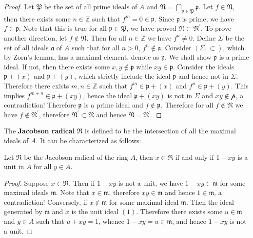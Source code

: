 \begin{proof}
Let $\mathfrak{P}$ be the set of all prime ideals of $A$ and $\mathfrak{N}=\bigcap_{\mathfrak{p}\in\mathfrak{P}}\mathfrak{p}$. Let $f\in\mathfrak{N}$, then there exists some $n\in\mathbb{Z}$ such that $f^m=0\in\mathfrak{p}$. Since $\mathfrak{p}$ is prime, we have $f\in\mathfrak{p}$. Note that this is true for all $\mathfrak{p}\in\mathfrak{P}$, we have proved $\mathfrak{N}\subset\mathfrak{N}^\prime$. To prove another direction, let $f\notin\mathfrak{N}$. Then for all $n\in\mathbb{Z}$ we have $f^n\ne 0$. Define $\Sigma$ be the set of all ideals $\mathfrak{a}$ of $A$ such that for all $n>0$, $f^n\notin\mathfrak{a}$. Consider $(\Sigma,\subset)$, which by Zorn's lemma, has a maximal element, denote as $\mathfrak{p}$. We shall show $\mathfrak{p}$ is a prime ideal. If not, then there exists some $x,y\notin\mathfrak{p}$ while $xy\in\mathfrak{p}$. Consider the ideals $\mathfrak{p}+(x)$ and $\mathfrak{p}+(y)$, which strictly include the ideal $\mathfrak{p}$ and hence not in $\Sigma$. Therefore there exists $m,n\in\mathbb{Z}$ such that $f^m\in\mathfrak{p}+(x)$ and $f^n\in\mathfrak{p}+(y)$. This implies $f^{m+n}\in\mathfrak{p}+(xy)$, hence the ideal $\mathfrak{p}+(xy)$ is not in $\Sigma$ and $xy\notin\mathcal{p}$, a contradiction! Therefore $\mathfrak{p}$ is a prime ideal and $f\notin\mathfrak{p}$. Therefore for all $f\notin\mathfrak{N}$ we have $f\notin\mathfrak{N}^\prime$, therefore $\mathfrak{N}^\prime\subset\mathfrak{N}$ and hence $\mathfrak{N}=\mathfrak{N}^\prime$.
\end{proof}
The \textbf{Jacobson radical} $\mathfrak{R}$ is defined to be the intersection of all the maximal ideals of $A$. It can be characterized as follows:
\begin{proposition}
Let $\mathfrak{R}$ be the Jacobson radical of the ring $A$, then $x\in\mathfrak{R}$ if and only if $1-xy$ is a unit in $A$ for all $y\in A$.
\end{proposition}
\begin{proof}
Suppose $x\in\mathfrak{R}$. Then if $1-xy$ is not a unit, we have $1-xy\in\mathfrak{m}$ for some maximal ideals $\mathfrak{m}$. Note that $x\in\mathfrak{m}$, therefore $xy\in\mathfrak{m}$ and hence $1\in\mathfrak{m}$, a contradiction! Conversely, if $x\notin\mathfrak{m}$ for some maximal ideal $\mathfrak{m}$. Then the ideal generated by $\mathfrak{m}$ and $x$ is the unit ideal $(1)$. Therefore there exists some $u\in\mathfrak{m}$ and $y\in A$ such that $u+xy=1$, whence $1-xy=u\in\mathfrak{m}$, and hence $1-xy$ is not a unit.
\end{proof}
